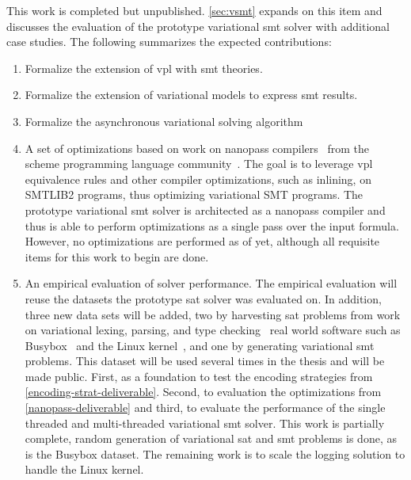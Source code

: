 \begin{enumerate}
  This work is completed but unpublished. \autoref{sec:vsmt} expands on this
  item and discusses the evaluation of the prototype variational \ac{smt} solver
  with additional case studies. The following summarizes the expected
  contributions:
  \begin{enumerate}
  \item \checkmark{} Formalize the extension of \ac{vpl} with \ac{smt} theories.
  \item \checkmark{} Formalize the extension of variational models to express
    \ac{smt} results.
  \item \checkmark{} Formalize the asynchronous variational solving algorithm
  \item\label{nanopass-deliverable} A set of optimizations based on work on
    nanopass compilers~\cite{10.1145/2500365.2500618} from the scheme
    programming language community~\cite{r7rs-scheme}. The goal is to leverage
    \ac{vpl} equivalence rules and other compiler optimizations, such as
    inlining, on SMTLIB2 programs, thus optimizing variational SMT programs. The
    prototype variational \ac{smt} solver is architected as a nanopass compiler
    and thus is able to perform optimizations as a single pass over the input
    formula. However, no optimizations are performed as of yet, although all
    requisite items for this work to begin are done.
  \item \label{eval-deliverable}An empirical evaluation of solver performance. The empirical evaluation
    will reuse the datasets the prototype \ac{sat} solver was evaluated on. In
    addition, three new data sets will be added, two by harvesting \ac{sat}
    problems from work on variational lexing, parsing, and type
    checking~\cite{KKHL:FOSD10} real world software such as
    Busybox~\cite{busybox} and the Linux kernel~\cite{linux}, and one by
    generating variational \ac{smt} problems. This dataset will be used several
    times in the thesis and will be made public. First, as a foundation to test
    the encoding strategies from \autoref{encoding-strat-deliverable}. Second,
    to evaluation the optimizations from \autoref{nanopass-deliverable} and
    third, to evaluate the performance of the single threaded and multi-threaded
    variational \ac{smt} solver. This work is partially complete, random
    generation of variational \ac{sat} and \ac{smt} problems is done, as is the
    Busybox dataset. The remaining work is to scale the logging solution to
    handle the Linux kernel.
  \end{enumerate}


\end{enumerate}
